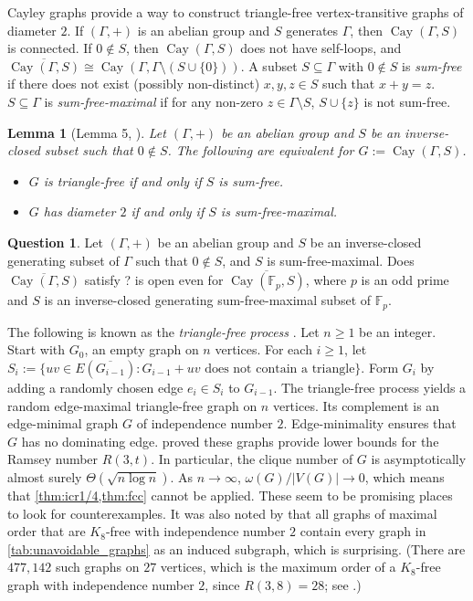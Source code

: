\documentclass[11pt]{article}
\numberwithin{equation}{section}
\theoremstyle{plain}
\newtheorem{lem}[equation]{Lemma}
\theoremstyle{definition}
\newtheorem{quest}[thm]{Question}
\renewcommand{\geq}{\geqslant}
\newcommand{\F}{\mathbb{F}}
\DeclareMathOperator{\Cay}{Cay}
\newcommand{\defn}[1]{\textcolor{green!50!black}{\textit{#1}}}
\begin{document}
Cayley graphs provide a way to construct triangle-free vertex-transitive graphs of diameter $2$. If $(\Gamma, +)$ is an abelian group and $S$ generates $\Gamma$, then $\Cay(\Gamma, S)$ is connected. If $0 \notin S$, then $\Cay(\Gamma, S)$ does not have self-loops, and $\overline{\Cay(\Gamma, S)} \cong \Cay(\Gamma, \Gamma \setminus (S \cup \{0\}))$. A subset $S \subseteq \Gamma$ with $0 \notin S$ is \defn{sum-free} if there does not exist (possibly non-distinct) $x, y, z \in S$ such that $x+y=z$. $S \subseteq \Gamma$ is \defn{sum-free-maximal} if for any non-zero $z \in \Gamma \setminus S$, $S \cup \{z\}$ is not sum-free.
\begin{lem}[Lemma 5, \citep{devillers2024triangle}]
    Let $(\Gamma, +)$ be an abelian group and $S$ be an inverse-closed subset such that $0 \notin S$. The following are equivalent for $G:= \Cay(\Gamma, S)$.
    \begin{itemize}
        \item $G$ is triangle-free if and only if $S$ is sum-free.
        \item $G$ has diameter $2$ if and only if $S$ is sum-free-maximal.
    \end{itemize}
\end{lem}
\begin{quest}
    \label{q:cayley}
    Let $(\Gamma, +)$ be an abelian group and $S$ be an inverse-closed generating subset of $\Gamma$ such that $0 \notin S$, and $S$ is sum-free-maximal. Does $\overline{\Cay(\Gamma, S)}$ satisfy ?  is open even for $\overline{\Cay(\F_p, S)}$, where $p$ is an odd prime and $S$ is an inverse-closed generating sum-free-maximal subset of $\F_p$.
\end{quest}

The following is known as the \defn{triangle-free process} \citep{Bohman09}. Let $n \geq 1$ be an integer. Start with $G_0$, an empty graph on $n$ vertices. For each $i \geq 1$, let $S_i:=\{uv \in E(\overline{G_{i-1}}): G_{i-1} + uv \text{ does not contain a triangle}\}$. Form $G_i$ by adding a randomly chosen edge $e_i \in S_i$ to $G_{i-1}$. The triangle-free process yields a random edge-maximal triangle-free graph on $n$ vertices. Its complement is an edge-minimal graph $G$ of independence number $2$. Edge-minimality ensures that $G$ has no dominating edge. \citet{Bohman09} proved these graphs provide lower bounds for the Ramsey number $R(3, t)$. In particular, the clique number of $G$ is asymptotically almost surely $\Theta(\sqrt{n \log n})$. As $n \to \infty$, $\omega(G)/|V(G)| \to 0$, which means that \cref{thm:icr1/4,thm:fcc}
cannot be applied. These seem to be promising places to look for counterexamples. It was also noted by \citet{Carter22} that all graphs of maximal order that are $K_8$-free with independence number $2$ contain every graph in \cref{tab:unavoidable_graphs} as an induced subgraph, which is surprising. (There are $477,142$ such graphs on $27$ vertices, which is the maximum order of a $K_8$-free graph with independence number $2$, since $R(3, 8) = 28$; see \citep{mckay_R38_1992}.)
\end{document}
